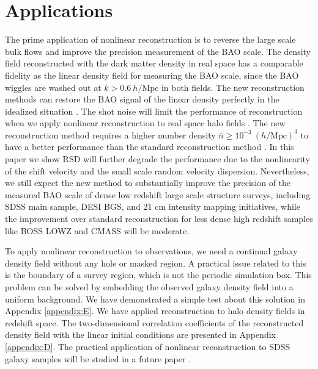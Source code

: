 \documentclass[aps,prx,twocolumn,superscriptaddress,groupedaddress,nofootinbib,amsfont]{revtex4}  %
\newcommand{\mr}{\mathrm}
\begin{document}
\section{Applications}
\label{sec:app}

The prime application of nonlinear reconstruction is to reverse the large scale
bulk flows and improve the precision measurement of the BAO scale. 
The density field reconstructed with the dark matter density in real space has
a comparable fidelity as the linear density field for measuring the BAO scale,
since the BAO wiggles are washed out at $k>0.6\ h/\mr{Mpc}$ in both fields.
The new reconstruction methods can restore the BAO signal of the linear density
perfectly in the idealized situation \cite{2017Marcel,2017Wang}.
The shot noise will limit the performance of reconstruction when we apply 
nonlinear reconstruction to real space halo fields \cite{2017Yu}.
The new reconstruction method requires a higher number density
$\bar{n}\geq10^{-3}\ (h/\mr{Mpc})^3$ to have a better performance than the 
standard reconstruction method \cite{2017Yu}.
In this paper we show RSD will further degrade the performance due to the nonlinearity of the shift velocity and the small scale random velocity dispersion.
Nevertheless, we still expect the new method to substantially improve the 
precision of the measured BAO scale of dense low redshift large scale 
structure surveys, including SDSS main sample, DESI BGS, and 21 cm intensity
mapping initiatives, while the improvement over standard reconstruction for
less dense high redshift samples like BOSS LOWZ and CMASS will be moderate.

To apply nonlinear reconstruction to observations, we need a continual galaxy
density field without any hole or masked region. A practical issue related to 
this is the boundary of a survey region, which is not the periodic simulation 
box. This problem can be solved by embedding the observed galaxy density field 
into a uniform background. We have demonstrated a simple test about this 
solution in Appendix \ref{appendix:E}. 
We have applied reconstruction to halo density fields in redshift space. 
The two-dimensional correlation coefficients of the reconstructed density field
with the linear initial conditions are presented in Appendix \ref{appendix:D}.
The practical application of nonlinear reconstruction to SDSS galaxy samples 
will be studied in a future paper \cite{2017Zhu}.
\end{document}
